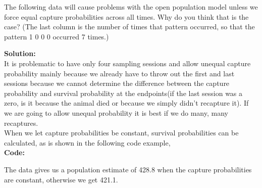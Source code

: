 \documentclass[12pt]{article}
\makeatletter
\theoremstyle{homework}
\newenvironment{exercise}[1]
{\def\@currentlabel{#1}\exercisecore}
{\endexercisecore}
\newcommand{\localhead}[1]{\par\smallskip\noindent\textbf{#1}\nobreak\\}%
\newcommand\solution{\localhead{Solution:}}
\makeatother
\begin{document}
\begin{exercise}{6} The following data will cause problems with the open population model unless we 
  force equal capture probabilities across all times. Why do you think that is the case? 
  (The last column is the number of times that pattern occurred, so that the pattern 1 0 0 0 occurred 7 times.)\\
  \solution It is problematic to have only four sampling sessions and allow unequal capture probability mainly because we 
  already have to throw out the first and last sessions because we cannot determine the difference between the capture probability and 
  survival probability at the endpoints(if the last session was a zero, is it because the animal died or because we simply didn't recapture it).
  If we are going to allow unequal probability it is best if we do many, many recaptures. \\
  When we let capture probabilities be constant, survival probabilities can be calculated, as is shown in the following code example, \\
  \textbf{Code:}  
  \begin{center}  
      
  \end{center}

  The data gives us a population estimate of 428.8 when the capture probabilities are constant, otherwise we get 421.1. \\

\end{exercise}
\end{document}
